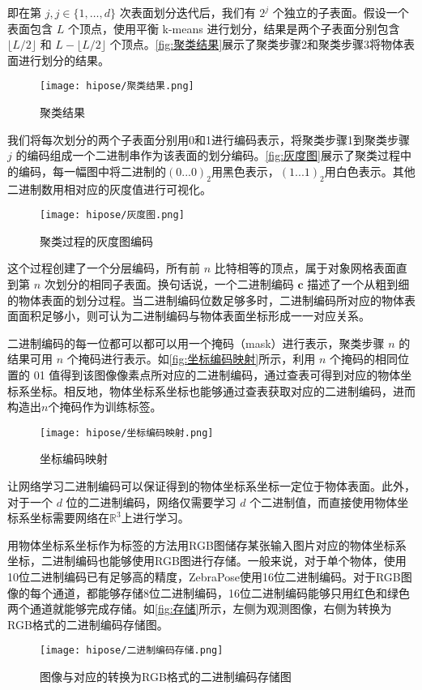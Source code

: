 即在第 $j, j \in \{1, \ldots, d\}$ 次表面划分迭代后，我们有 $2^{j}$ 个独立的子表面。假设一个表面包含 $L$ 个顶点，使用平衡 k-means 进行划分，结果是两个子表面分别包含 $\lfloor L/2 \rfloor$ 和 $L-\lfloor L/2 \rfloor$ 个顶点。\autoref{fig:聚类结果}展示了聚类步骤2和聚类步骤3将物体表面进行划分的结果。

\begin{figure}[ht]
    \centering
    \texttt{[image: hipose/聚类结果.png]}
    \caption{聚类结果}
    \label{fig:聚类结果}
\end{figure}

我们将每次划分的两个子表面分别用0和1进行编码表示，将聚类步骤1到聚类步骤 $j$ 的编码组成一个二进制串作为该表面的划分编码。\autoref{fig:灰度图}展示了聚类过程中的编码，每一幅图中将二进制的$(0...0)_2$用黑色表示，$(1...1)_2$用白色表示。其他二进制数用相对应的灰度值进行可视化。

\begin{figure}[ht]
    \centering
    \texttt{[image: hipose/灰度图.png]}
    \caption{聚类过程的灰度图编码}
    \label{fig:灰度图}
\end{figure}

这个过程创建了一个分层编码，所有前 $n$ 比特相等的顶点，属于对象网格表面直到第 $n$ 次划分的相同子表面。换句话说，一个二进制编码 $\mathbf{c}$ 描述了一个从粗到细的物体表面的划分过程。当二进制编码位数足够多时，二进制编码所对应的物体表面面积足够小，则可认为二进制编码与物体表面坐标形成一一对应关系。

二进制编码的每一位都可以都可以用一个掩码（mask）进行表示，聚类步骤 $n$ 的结果可用 $n$ 个掩码进行表示。如\autoref{fig:坐标编码映射}所示，利用 $n$ 个掩码的相同位置的 01 值得到该图像像素点所对应的二进制编码，通过查表可得到对应的物体坐标系坐标。相反地，物体坐标系坐标也能够通过查表获取对应的二进制编码，进而构造出$n$个掩码作为训练标签。

\begin{figure}[ht]
    \centering
    \texttt{[image: hipose/坐标编码映射.png]}
    \caption{坐标编码映射}
    \label{fig:坐标编码映射}
\end{figure}

\par 让网络学习二进制编码可以保证得到的物体坐标系坐标一定位于物体表面。此外，对于一个 $d$ 位的二进制编码，网络仅需要学习 $d$ 个二进制值，而直接使用物体坐标系坐标需要网络在$\mathbb{R}^3$上进行学习。

用物体坐标系坐标作为标签的方法用RGB图储存某张输入图片对应的物体坐标系坐标，二进制编码也能够使用RGB图进行存储。一般来说，对于单个物体，使用10位二进制编码已有足够高的精度，ZebraPose使用16位二进制编码。对于RGB图像的每个通道，都能够存储8位二进制编码，16位二进制编码能够只用红色和绿色两个通道就能够完成存储。如\autoref{fig:存储}所示，左侧为观测图像，右侧为转换为RGB格式的二进制编码存储图。

\begin{figure}[ht]
    \centering
    \texttt{[image: hipose/二进制编码存储.png]}
    \caption{图像与对应的转换为RGB格式的二进制编码存储图}
    \label{fig:存储}
\end{figure}
